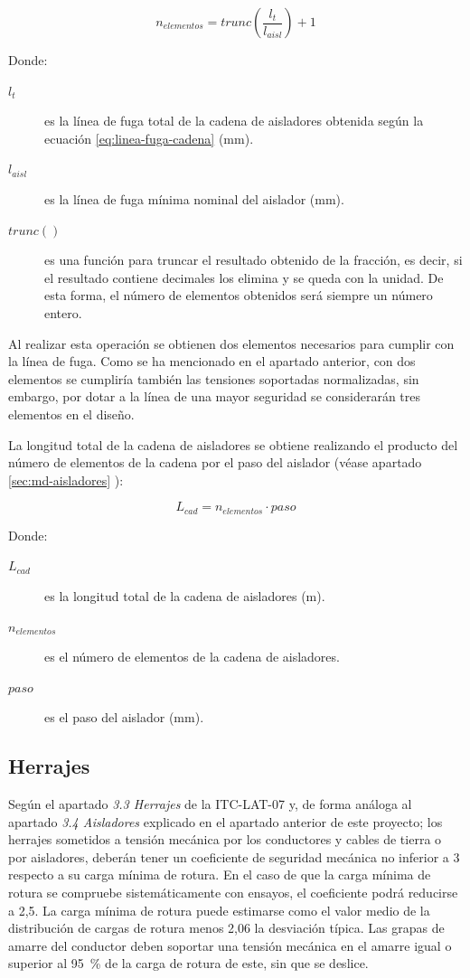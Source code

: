 \begin{equation}
    n_{elementos}=trunc(\frac{l_t}{l_{aisl}})+1
    \label{eq:numero-elementos-cadena}
\end{equation}

Donde:
\begin{description}
    \item[$l_t$] es la línea de fuga total de la cadena de aisladores obtenida según la ecuación \ref{eq:linea-fuga-cadena} (\si{\milli\meter}).
    \item [$l_{aisl}$] es la línea de fuga mínima nominal del aislador (\si{\milli\meter}).
    \item[$trunc()$] es una función para truncar el resultado obtenido de la fracción, es decir, si el resultado contiene decimales los elimina y se queda con la unidad. De esta forma, el número de elementos obtenidos será siempre un número entero.
\end{description}

Al realizar esta operación se obtienen dos elementos necesarios para cumplir con la línea de fuga. Como se ha mencionado en el apartado anterior, con dos elementos se cumpliría también las tensiones soportadas normalizadas, sin embargo, por dotar a la línea de una mayor seguridad se considerarán tres elementos en el diseño.

La longitud total de la cadena de aisladores se obtiene realizando el producto del número de elementos de la cadena por el paso del aislador (véase apartado \ref{sec:md-aisladores} ):

\begin{equation}
    L_{cad}=n_{elementos}\cdot paso
    \label{eq:longitud-cadena}
\end{equation}

Donde:
\begin{description}
    \item[$L_{cad}$] es la longitud total de la cadena de aisladores (\si{\meter}).
    \item[$n_{elementos}$] es el número de elementos de la cadena de aisladores.
    \item[$paso$] es el paso del aislador (\si{\milli\meter}).
\end{description}
\subsection{Herrajes} 
\label{subsec:aisl-herrajes}
Según el apartado \textit{3.3 Herrajes} de la ITC-LAT-07 y, de forma análoga al apartado \textit{3.4 Aisladores} explicado en el apartado anterior de este proyecto; los herrajes sometidos a tensión mecánica por los conductores y cables de tierra o por aisladores, deberán tener un coeficiente de seguridad mecánica no inferior a 3 respecto a su carga mínima de rotura. En el caso de que la carga mínima de rotura se compruebe sistemáticamente con ensayos, el coeficiente podrá reducirse a 2,5. La carga mínima de rotura puede estimarse como el valor medio de la distribución de cargas de rotura menos 2,06 la desviación típica. Las grapas de amarre del conductor deben soportar una tensión mecánica en el amarre igual o superior al \SI{95}{\percent} de la carga de rotura de este, sin que se deslice. 

